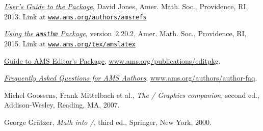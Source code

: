 \begin{thebibliography}{[ASMR]}
 \href{ftp://ftp.ams.org/pub/tex/amsrefs/amsrdoc.pdf}{\textit{User's Guide to the  Package}},
David Jones, Amer. Math. Soc., Providence, RI, 2013. Link at 
\href{http://www.ams.org/authors/amsrefs}{\texttt{www.ams.org/authors/amsrefs}}


\href{ftp://ftp.ams.org/pub/tex/doc/amscls/amsthdoc.pdf}
{\textit{Using the \texttt{amsthm} Package}},
version~2.20.2, Amer. Math. Soc., Providence, RI, 2015.  Link at 
\href{http://www.ams.org/tex/amslatex.html}{\texttt{www.ams.org/tex/amslatex}}


\ifproceedings
{}
\href{http://www.ams.org/publications/editpkg}
{Guide to AMS Editor's Package},
\url{www.ams.org/publications/editpkg}.
\fi

\href{http://www.ams.org/authors/author-faq}
{\textit{Frequently Asked Questions for AMS Authors}},
\url{www.ams.org/authors/author-faq}.



  Michel Goossens, Frank Mittelbach et al.,
\textit{The \latex/ Graphics companion}, second ed., Addison-Wesley, Reading,
MA, 2007.

 George Gr\"atzer, \textit{Math into \latex/}, third ed.,
Springer, New York, 2000.



\end{thebibliography}
